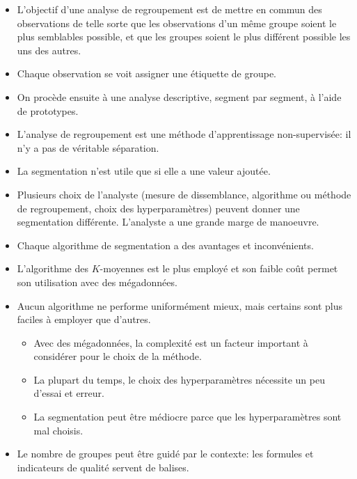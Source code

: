 \documentclass[
  11pt,
  letterpaper,
]{scrbook}
\providecommand{\tightlist}{%
  \setlength{\itemsep}{0pt}\setlength{\parskip}{0pt}}\usepackage{longtable,booktabs,array}
\theoremstyle{definition}
\theoremstyle{remark}
\begin{document}
\begin{tcolorbox}[enhanced jigsaw, title=\textcolor{quarto-callout-note-color}{\faInfo}\hspace{0.5em}{En résumé}, toptitle=1mm, bottomrule=.15mm, leftrule=.75mm, left=2mm, opacityback=0, colbacktitle=quarto-callout-note-color!10!white, coltitle=black, toprule=.15mm, colframe=quarto-callout-note-color-frame, breakable, bottomtitle=1mm, titlerule=0mm, arc=.35mm, colback=white, rightrule=.15mm, opacitybacktitle=0.6]

\begin{itemize}
\tightlist
\item
  L'objectif d'une analyse de regroupement est de mettre en commun des
  observations de telle sorte que les observations d'un même groupe
  soient le plus semblables possible, et que les groupes soient le plus
  différent possible les uns des autres.
\item
  Chaque observation se voit assigner une étiquette de groupe.
\item
  On procède ensuite à une analyse descriptive, segment par segment, à
  l'aide de prototypes.
\item
  L'analyse de regroupement est une méthode d'apprentissage
  non-supervisée: il n'y a pas de véritable séparation.
\item
  La segmentation n'est utile que si elle a une valeur ajoutée.
\item
  Plusieurs choix de l'analyste (mesure de dissemblance, algorithme ou
  méthode de regroupement, choix des hyperparamètres) peuvent donner une
  segmentation différente. L'analyste a une grande marge de manoeuvre.
\item
  Chaque algorithme de segmentation a des avantages et inconvénients.
\item
  L'algorithme des \(K\)-moyennes est le plus employé et son faible coût
  permet son utilisation avec des mégadonnées.
\item
  Aucun algorithme ne performe uniformément mieux, mais certains sont
  plus faciles à employer que d'autres.

  \begin{itemize}
  \tightlist
  \item
    Avec des mégadonnées, la complexité est un facteur important à
    considérer pour le choix de la méthode.
  \item
    La plupart du temps, le choix des hyperparamètres nécessite un peu
    d'essai et erreur.
  \item
    La segmentation peut être médiocre parce que les hyperparamètres
    sont mal choisis.
  \end{itemize}
\item
  Le nombre de groupes peut être guidé par le contexte: les formules et
  indicateurs de qualité servent de balises.
\end{itemize}

\end{tcolorbox}
\end{document}
